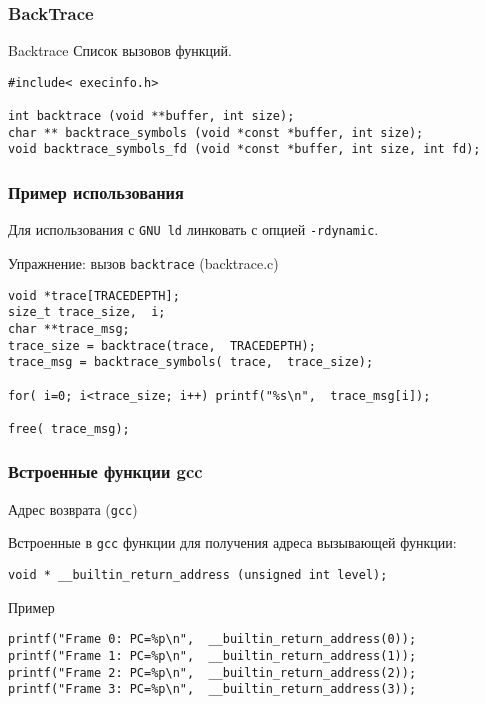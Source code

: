 
\begin{frame}[fragile]
	\frametitle{BackTrace}

	\begin{block}{Backtrace}
		Список вызовов функций.
	\end{block}

	\begin{lstlisting}
#include< execinfo.h>

int backtrace (void **buffer, int size);
char ** backtrace_symbols (void *const *buffer, int size);
void backtrace_symbols_fd (void *const *buffer, int size, int fd);
	\end{lstlisting}

\end{frame}

\begin{frame}[fragile]
	\frametitle{Пример использования}

	Для использования с {\tt GNU ld} линковать с опцией {\tt -rdynamic}.

	\begin{block}{Упражнение: вызов {\tt backtrace} (backtrace.c)}

	\begin{lstlisting}
void *trace[TRACEDEPTH];
size_t trace_size,  i;
char **trace_msg;
trace_size = backtrace(trace,  TRACEDEPTH);
trace_msg = backtrace_symbols( trace,  trace_size);

for( i=0; i<trace_size; i++) printf("%s\n",  trace_msg[i]);

free( trace_msg);
	\end{lstlisting}


	\end{block}
\end{frame}

\begin{frame}[fragile]
	\frametitle{Встроенные функции gcc}

	\begin{block}{Адрес возврата ({\tt gcc})}
		
		Встроенные в {\tt gcc} функции для получения адреса вызывающей функции:

	\begin{lstlisting}
void * __builtin_return_address (unsigned int level);
	\end{lstlisting}
	\end{block}

	\begin{block}{Пример}
		
	\begin{lstlisting}
printf("Frame 0: PC=%p\n",  __builtin_return_address(0));
printf("Frame 1: PC=%p\n",  __builtin_return_address(1));
printf("Frame 2: PC=%p\n",  __builtin_return_address(2));
printf("Frame 3: PC=%p\n",  __builtin_return_address(3));
	\end{lstlisting}
	\end{block}

\end{frame}

